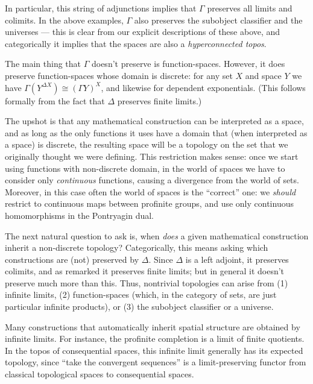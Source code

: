 \documentclass[10pt]{article}
\def\N{\mathbb{N}}
\def\R{\mathbb{R}}
\def\T{\mathcal{T}}
\numberwithin{equation}{section}
\begin{document}
In particular, this string of adjunctions implies that $\Gamma$ preserves all limits and colimits.
In the above examples, $\Gamma$ also preserves the subobject classifier and the universes --- this is clear from our explicit descriptions of these above, and categorically it implies that the spaces are also a \emph{hyperconnected topos}.

The main thing that $\Gamma$ doesn't preserve is function-spaces.
However, it does preserve function-spaces whose domain is discrete: for any set $X$ and space $Y$ we have $\Gamma(Y^{\Delta X}) \cong (\Gamma Y)^X$, and likewise for dependent exponentials.
(This follows formally from the fact that $\Delta$ preserves finite limits.)

The upshot is that any mathematical construction can be interpreted as a space, and as long as the only functions it uses have a domain that (when interpreted as a space) is discrete, the resulting space will be a topology on the set that we originally thought we were defining.
This restriction makes sense: once we start using functions with non-discrete domain, in the world of spaces we have to consider only \emph{continuous} functions, causing a divergence from the world of sets.
Moreover, in this case often the world of spaces is the ``correct'' one: we \emph{should} restrict to continuous maps between profinite groups, and use only continuous homomorphisms in the Pontryagin dual.

The next natural question to ask is, when \emph{does} a given mathematical construction inherit a non-discrete topology?
Categorically, this means asking which constructions are (not) preserved by $\Delta$.
Since $\Delta$ is a left adjoint, it preserves colimits, and as remarked it preserves finite limits; but in general it doesn't preserve much more than this.
Thus, nontrivial topologies can arise from (1) infinite limits,
(2) function-spaces (which, in the category of sets, are just particular infinite products), or (3) the subobject classifier or a universe.

Many constructions that automatically inherit spatial structure are obtained by infinite limits.
For instance, the profinite completion is a limit of finite quotients.
In the topos of consequential spaces, this infinite limit generally has its expected topology, since ``take the convergent sequences'' is a limit-preserving functor from classical topological spaces to consequential spaces.
\end{document}
